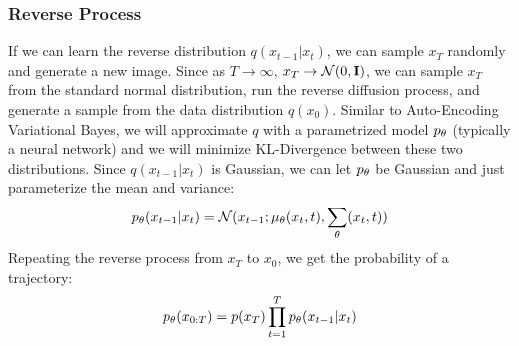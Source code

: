 \documentclass{article}
\begin{document}
\subsubsection{Reverse Process}
If we can learn the reverse distribution $q(x_{t-1}|x_t)$, we can sample $x_T$ randomly and generate a new image. Since as $T \rightarrow \infty$, $x_T \rightarrow \mathcal{N}(0,\mathbf{I})$, we can sample $x_T$ from the standard normal distribution, run the reverse diffusion process, and generate a sample from the data distribution $q(x_0)$.
Similar to Auto-Encoding Variational Bayes, we will approximate $q$ with a parametrized model $p_\theta$ (typically a neural network) and we will minimize KL-Divergence between these two distributions. Since $q(x_{t-1}|x_t)$ is Gaussian, we can let $p_\theta$ be Gaussian and just parameterize the mean and variance:
\begin{align}
    p_\theta(x_{t-1}|x_t) = \mathcal{N}(x_{t-1}; \mu_\theta(x_t,t),\sum_\theta(x_t,t))
\end{align}
Repeating the reverse process from $x_T$ to $x_0$, we get the probability of a trajectory:
\begin{align}
    p_\theta(x_{0:T}) = p(x_T)\prod_{t=1}^Tp_\theta(x_{t-1}|x_t)
\end{align}
\end{document}
